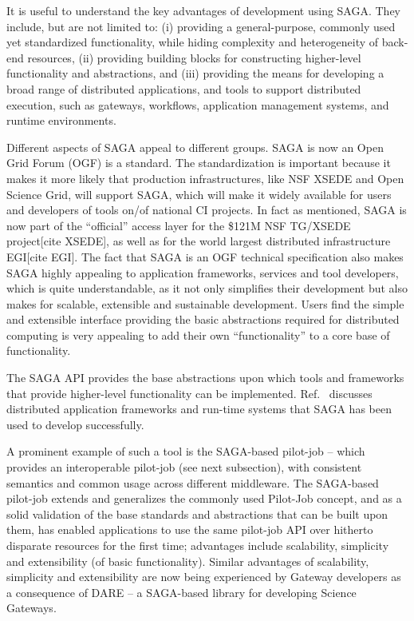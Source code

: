 \documentclass[]{svjour3}
\begin{document}
It is useful to understand the key advantages of development using
SAGA. They include, but are not limited to: (i) providing a
general-purpose, commonly used yet standardized functionality, while
hiding complexity and heterogeneity of back-end resources, (ii)
providing building blocks for constructing higher-level functionality
and abstractions, and (iii) providing the means for developing a broad
range of distributed applications, and tools to support distributed
execution, such as gateways, workflows, application management
systems, and runtime environments.

Different aspects of SAGA appeal to different groups. SAGA is now an
Open Grid Forum (OGF) is a standard. The standardization is important
because it makes it more likely that production infrastructures, like
NSF XSEDE and Open Science Grid, will support SAGA, which will make it
widely available for users and developers of tools on/of national CI
projects. In fact as mentioned, SAGA is now part of the “official”
access layer for the \$121M NSF TG/XSEDE project[cite XSEDE], as well
as for the world largest distributed infrastructure EGI[cite EGI]. The
fact that SAGA is an OGF technical specification also makes SAGA
highly appealing to application frameworks, services and tool
developers, which is quite understandable, as it not only simplifies
their development but also makes for scalable, extensible and
sustainable development. Users find the simple and extensible interface
providing the basic abstractions required for distributed computing is
very appealing to add their own “functionality” to a core base of
functionality.

The SAGA API provides the base abstractions upon which tools and
frameworks that provide higher-level functionality can be
implemented. Ref.~\cite{saga_url} discusses distributed application
frameworks and run-time systems that SAGA has been used to develop
successfully. 

A prominent example of such a tool is the SAGA-based pilot-job – which
provides an interoperable pilot-job (see next subsection), with
consistent semantics and common usage across different middleware. The
SAGA-based pilot-job extends and generalizes the commonly used
Pilot-Job concept, and as a solid validation of the base standards and
abstractions that can be built upon them, has enabled applications to
use the same pilot-job API over hitherto disparate resources for the
first time; advantages include scalability, simplicity and
extensibility (of basic functionality). Similar advantages of
scalability, simplicity and extensibility are now being experienced by
Gateway developers as a consequence of DARE – a SAGA-based library for
developing Science Gateways.
\end{document}
